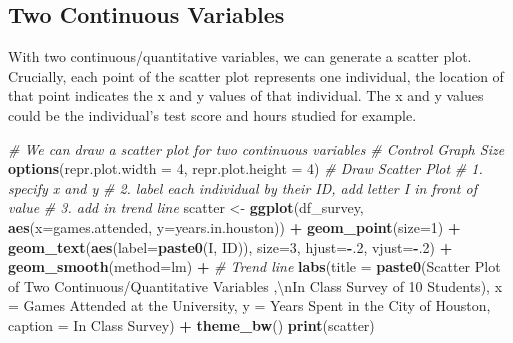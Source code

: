 \documentclass[
]{book}
\newenvironment{Shaded}{\begin{snugshade}}{\end{snugshade}}
\newcommand{\CharTok}[1]{\textcolor[rgb]{0.31,0.60,0.02}{#1}}
\newcommand{\CommentTok}[1]{\textcolor[rgb]{0.56,0.35,0.01}{\textit{#1}}}
\newcommand{\DataTypeTok}[1]{\textcolor[rgb]{0.13,0.29,0.53}{#1}}
\newcommand{\DecValTok}[1]{\textcolor[rgb]{0.00,0.00,0.81}{#1}}
\newcommand{\KeywordTok}[1]{\textcolor[rgb]{0.13,0.29,0.53}{\textbf{#1}}}
\newcommand{\NormalTok}[1]{#1}
\newcommand{\OperatorTok}[1]{\textcolor[rgb]{0.81,0.36,0.00}{\textbf{#1}}}
\newcommand{\StringTok}[1]{\textcolor[rgb]{0.31,0.60,0.02}{#1}}
\begin{document}
\hypertarget{two-continuous-variables}{%
\subsection{Two Continuous Variables}\label{two-continuous-variables}}

With two continuous/quantitative variables, we can generate a scatter plot. Crucially, each point of the scatter plot represents one individual, the location of that point indicates the x and y values of that individual. The x and y values could be the individual's test score and hours studied for example.

\begin{Shaded}
\begin{Highlighting}[]
\CommentTok{\# We can draw a scatter plot for two continuous variables}
\CommentTok{\# Control Graph Size}
\KeywordTok{options}\NormalTok{(}\DataTypeTok{repr.plot.width =} \DecValTok{4}\NormalTok{, }\DataTypeTok{repr.plot.height =} \DecValTok{4}\NormalTok{)}
\CommentTok{\# Draw Scatter Plot}
\CommentTok{\# 1. specify x and y}
\CommentTok{\# 2. label each individual by their ID, add letter I in front of value}
\CommentTok{\# 3. add in trend line}
\NormalTok{scatter \textless{}{-}}\StringTok{ }\KeywordTok{ggplot}\NormalTok{(df\_survey, }\KeywordTok{aes}\NormalTok{(}\DataTypeTok{x=}\NormalTok{games.attended, }\DataTypeTok{y=}\NormalTok{years.in.houston)) }\OperatorTok{+}
\StringTok{      }\KeywordTok{geom\_point}\NormalTok{(}\DataTypeTok{size=}\DecValTok{1}\NormalTok{) }\OperatorTok{+}
\StringTok{      }\KeywordTok{geom\_text}\NormalTok{(}\KeywordTok{aes}\NormalTok{(}\DataTypeTok{label=}\KeywordTok{paste0}\NormalTok{(}\StringTok{\textquotesingle{}I\textquotesingle{}}\NormalTok{, ID)), }\DataTypeTok{size=}\DecValTok{3}\NormalTok{, }\DataTypeTok{hjust=}\OperatorTok{{-}}\NormalTok{.}\DecValTok{2}\NormalTok{, }\DataTypeTok{vjust=}\OperatorTok{{-}}\NormalTok{.}\DecValTok{2}\NormalTok{) }\OperatorTok{+}
\StringTok{      }\KeywordTok{geom\_smooth}\NormalTok{(}\DataTypeTok{method=}\NormalTok{lm) }\OperatorTok{+}\StringTok{ }\CommentTok{\# Trend line}
\StringTok{      }\KeywordTok{labs}\NormalTok{(}\DataTypeTok{title =} \KeywordTok{paste0}\NormalTok{(}\StringTok{\textquotesingle{}Scatter Plot of Two Continuous/Quantitative Variables\textquotesingle{}}
\NormalTok{                          ,}\StringTok{\textquotesingle{}}\CharTok{\textbackslash{}n}\StringTok{In Class Survey of 10 Students\textquotesingle{}}\NormalTok{),}
           \DataTypeTok{x =} \StringTok{\textquotesingle{}Games Attended at the University\textquotesingle{}}\NormalTok{,}
           \DataTypeTok{y =} \StringTok{\textquotesingle{}Years Spent in the City of Houston\textquotesingle{}}\NormalTok{,}
           \DataTypeTok{caption =} \StringTok{\textquotesingle{}In Class Survey\textquotesingle{}}\NormalTok{) }\OperatorTok{+}
\StringTok{      }\KeywordTok{theme\_bw}\NormalTok{()}
\KeywordTok{print}\NormalTok{(scatter)}
\end{Highlighting}
\end{Shaded}
\end{document}
